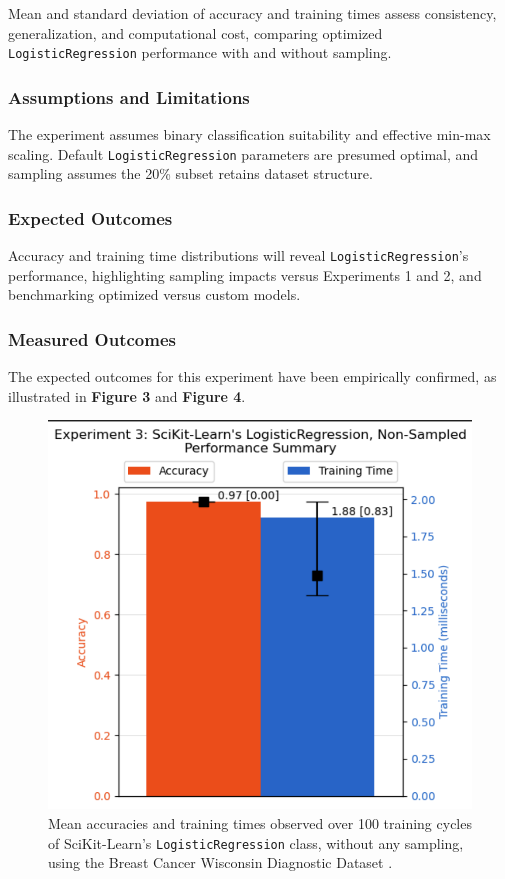 \documentclass{article}
\theoremstyle{plain}
\theoremstyle{definition}
\theoremstyle{remark}
\begin{document}
Mean and standard deviation of accuracy and training times assess consistency, generalization, and computational cost, comparing optimized \texttt{LogisticRegression} performance with and without sampling.

\subsubsection{Assumptions and Limitations}

The experiment assumes binary classification suitability and effective min-max scaling. Default \texttt{LogisticRegression} parameters are presumed optimal, and sampling assumes the 20\% subset retains dataset structure.

\subsubsection{Expected Outcomes}

Accuracy and training time distributions will reveal \texttt{LogisticRegression}'s performance, highlighting sampling impacts versus Experiments 1 and 2, and benchmarking optimized versus custom models.

\subsubsection{Measured Outcomes}

The expected outcomes for this experiment have been empirically confirmed, as illustrated in \textbf{Figure 3} and \textbf{Figure 4}.

\begin{figure}[ht]
	\vskip 0.2in
	\begin{center}
		\centerline{\includegraphics[width=\columnwidth]{experiment_03}}
		\caption{Mean accuracies and training times observed over 100 training cycles of SciKit-Learn's \texttt{LogisticRegression} class, without any sampling, using the Breast Cancer Wisconsin Diagnostic Dataset \cite{breastcancer}.}
		\label{experiment_03}
	\end{center}
	\vskip -0.2in
\end{figure}
\end{document}
